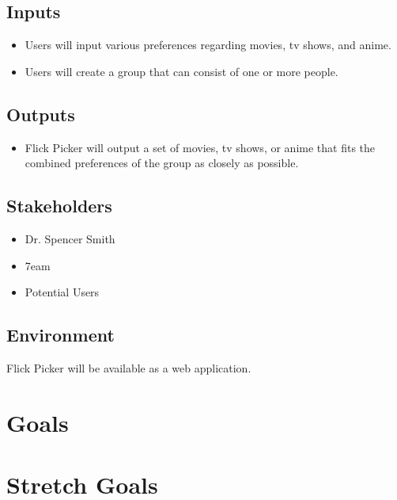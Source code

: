 \documentclass{article}
\begin{document}
\subsection{Inputs}
\begin{itemize}
	\item Users will input various preferences regarding movies, tv shows, and anime. 
	\item Users will create a group that can consist of one or more people.
\end{itemize}

\subsection{Outputs}
\begin{itemize}
	\item Flick Picker will output a set of movies, tv shows, or anime that fits the combined preferences of the group as closely as possible.
\end{itemize}

\subsection{Stakeholders}

\begin{itemize}
	\item Dr. Spencer Smith
	\item 7eam
	\item Potential Users
\end{itemize}

\subsection{Environment}

Flick Picker will be available as a web application.

\section{Goals}

\section{Stretch Goals}
\end{document}

